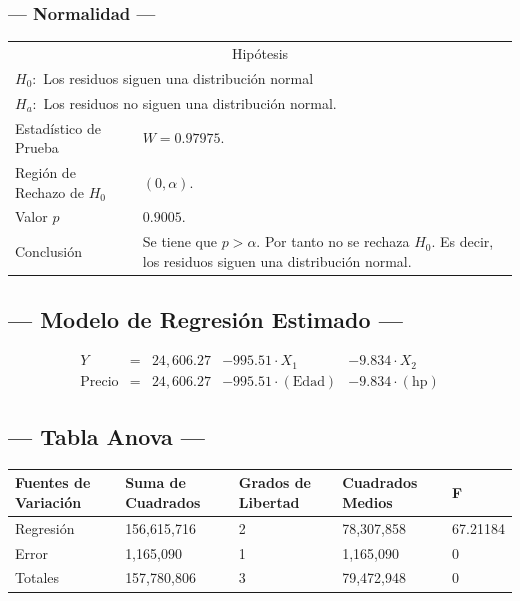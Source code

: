 \subsubsection{--- Normalidad ---} %
\begin{center}
  \begin{tabular}{|l|p{8cm}|}
    \cline{1-2}
    \multicolumn{2}{|c|}{Hipótesis}\\ \cline{1-2}
    \multicolumn{2}{|l|}{\(H_0:\) Los residuos siguen una distribución normal} \\ 
    \multicolumn{2}{|l|}{\(H_a:\) Los residuos no siguen una distribución normal.} \\ \cline{1-2}
    Estadístico de Prueba & \(W = 0.97975\).\\ \cline{1-2} 
		Región de Rechazo de \(H_0\) & \((0, \alpha )\).\\ \cline{1-2} 
    Valor \(p\) & \(0.9005\).\\ \cline{1-2} 
    Conclusión & Se tiene que \(p> \alpha\). \newline 
		Por tanto no se rechaza \(H_0\). \newline 
		Es decir, los residuos siguen una distribución normal.\\ \cline{1-2} 
  \end{tabular}
\end{center}


\subsection{\centering --- Modelo de Regresión Estimado ---} %
\begin{align}
	Y & = &              24,606.27 & - 995.51 \cdot X_1           & - 9.834  \cdot X_2   \\[2mm]
	\mbox{Precio} & = &  24,606.27 & - 995.51 \cdot (\mbox{Edad}) & - 9.834  \cdot (\mbox{hp})
	\label{eq:6}
\end{align}

\subsection{\centering --- Tabla Anova ---} %
\begin{center}
  \begin{tabular}{|l|l|l|l|l|}
    \hline 
    Fuentes de Variación  & Suma de Cuadrados & Grados de Libertad & Cuadrados Medios & F\\ \hline 
		Regresión & 156,615,716 & 2 & 78,307,858 & 67.21184 \\ \hline
		Error     &   1,165,090 & 1 &  1,165,090 &  0 \\ \hline
		Totales   & 157,780,806 & 3 & 79,472,948 &  0 \\ \hline
  \end{tabular}
\end{center} 


